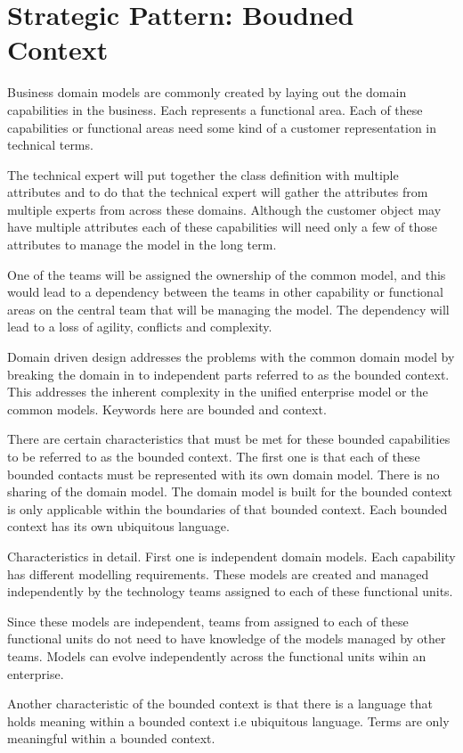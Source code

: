 \section{Strategic Pattern: Boudned Context}
Business domain models are commonly created by laying out the domain capabilities in the business.
Each represents a functional area.
Each of these capabilities or functional areas need some kind of a customer representation in technical terms.

The technical expert will put together the class definition with multiple attributes and to do that the technical expert will gather the attributes from multiple experts from across these domains.
Although the customer object may have multiple attributes each of these capabilities will need only a few of those attributes to manage the model in the long term.

One of the teams will be assigned the ownership of the common model, and this would lead to a dependency between the teams in other capability or functional areas on the central team that will be managing the model.
The dependency will lead to a loss of agility, conflicts and complexity.

Domain driven design addresses the problems with the common domain model by breaking the domain in to independent parts referred to as the bounded context.
This addresses the inherent complexity in the unified enterprise model or the common models.
Keywords here are bounded and context.

There are certain characteristics that must be met for these bounded capabilities to be referred to as the bounded context.
The first one is that each of these bounded contacts must be represented with its own domain model.
There is no sharing of the domain model.
The domain model is built for the bounded context is only applicable within the boundaries of that bounded context.
Each bounded context has its own ubiquitous language.

Characteristics in detail.
First one is independent domain models.
Each capability has different modelling requirements.
These models are created and managed independently by the technology teams assigned to each of these functional units.

Since these models are independent, teams from assigned to each of these functional units do not need to have knowledge of the models managed by other teams.
Models can evolve independently across the functional units wihin an enterprise.

Another characteristic of the bounded context is that there is a language that holds meaning within a bounded context i.e ubiquitous language.
Terms are only meaningful within a bounded context.

